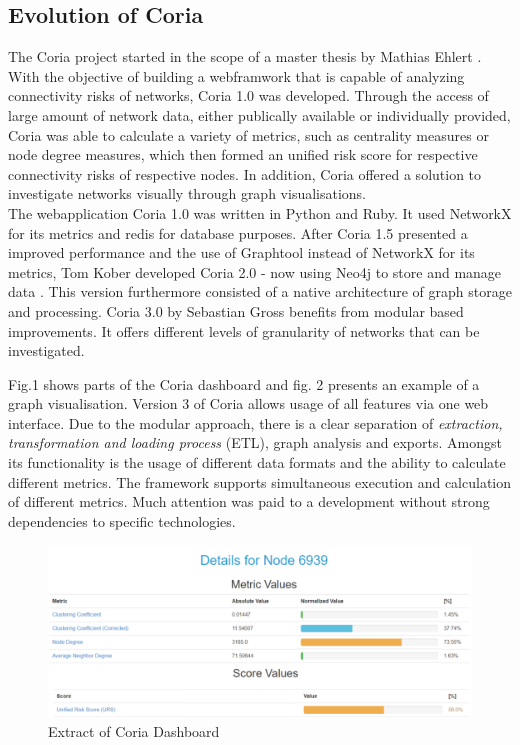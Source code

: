 \documentclass[conference, 11pt]{IEEEtran}
\begin{document}
\subsection{Evolution of Coria}
The Coria project started in the scope of a master thesis by Mathias Ehlert \cite{Ehlert}. With the objective of building a webframwork that is capable of analyzing connectivity risks of networks, Coria 1.0 was developed. Through the access of large amount of network data, either publically available or individually provided, Coria was able to calculate a variety of metrics, such as  
centrality measures or node degree measures, which then formed an unified risk score for respective connectivity risks of respective nodes. In addition, Coria offered a solution to investigate networks visually through graph visualisations. \\ \linebreak 
 The webapplication Coria 1.0 was written in Python and Ruby. It used NetworkX for its metrics and redis for database purposes. After Coria 1.5 presented a improved performance and the use of Graphtool instead of NetworkX for its metrics, Tom Kober developed Coria 2.0 - now using Neo4j to store and manage data \cite{BA}. This version furthermore consisted of a native architecture of graph storage and processing\cite{Coria2}. Coria 3.0 by Sebastian Gross benefits from modular based improvements. It offers different levels of granularity of networks that can be investigated. \linebreak

Fig.1 shows parts of the Coria dashboard and fig. 2 presents an example of a graph visualisation. Version 3 of Coria allows usage of all features via one web interface. Due to the modular approach, there is a clear separation of \textit{extraction, transformation and loading process} (ETL), graph analysis and exports. Amongst its functionality is the usage of different data formats and the ability to calculate different metrics. The framework supports simultaneous execution and calculation of different metrics. Much attention was paid to a development without strong dependencies to specific technologies\cite{Coria3}. \\ \linebreak
 
 \begin{figure}[htbp]
\centerline{\includegraphics[scale=0.39]{Graphics/CoriaExtract.PNG}}
\caption{Extract of Coria Dashboard}
\label{fig}
\end{figure} 
\end{document}
